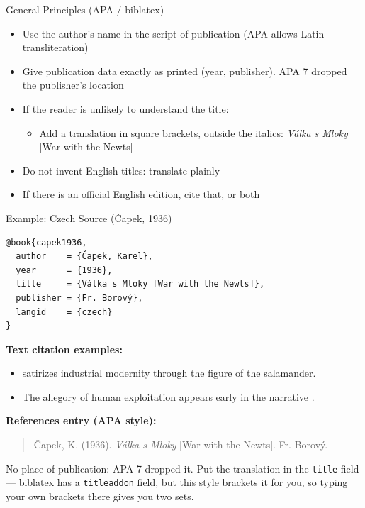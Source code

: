 \documentclass[aspectratio=169]{beamer}
\begin{document}
\begin{frame}{General Principles (APA / biblatex)}
\begin{itemize}
  \item Use the author’s name in the script of publication (APA allows Latin transliteration)
  \item Give publication data exactly as printed (year, publisher).  APA 7
    dropped the publisher's location
  \item If the reader is unlikely to understand the title:
    \begin{itemize}
      \item Add a translation in square brackets, outside the italics:
        \emph{Válka s Mloky} [War with the Newts]
    \end{itemize}
  \item Do not invent English titles: translate plainly
  \item If there is an official English edition, cite that, or both
\end{itemize}
\end{frame}

\begin{frame}[fragile]{Example: Czech Source (Čapek, 1936)}
\small
\begin{verbatim}
@book{capek1936,
  author    = {Čapek, Karel},
  year      = {1936},
  title     = {Válka s Mloky [War with the Newts]},
  publisher = {Fr. Borový},
  langid    = {czech}
}
\end{verbatim}

\textbf{Text citation examples:}
\begin{itemize}
  \item \citet{capek1936} satirizes industrial modernity through the figure of the salamander.
  \item The allegory of human exploitation appears early in the narrative \citep{capek1936}.
\end{itemize}

\textbf{References entry (APA style):}
\begin{quote}
Čapek, K. (1936). \emph{Válka s Mloky} [War with the Newts]. Fr. Borový.
\end{quote}
{\footnotesize No place of publication: APA 7 dropped it.  Put the
translation in the \texttt{title} field --- biblatex has a
\texttt{titleaddon} field, but this style brackets it for you, so typing your
own brackets there gives you two sets.}
\end{frame}
\end{document}
